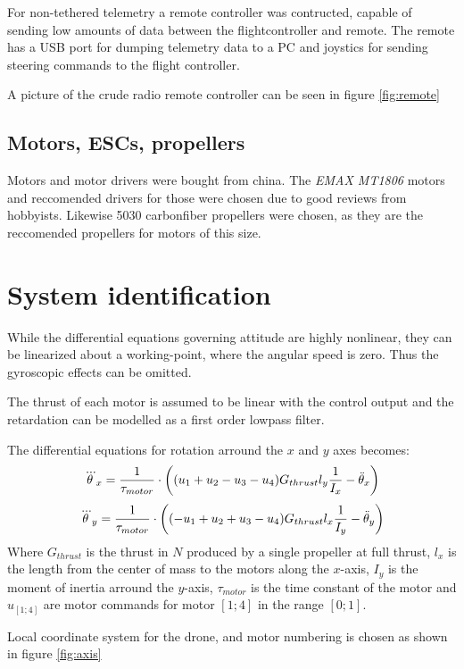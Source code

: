 For non-tethered telemetry a remote controller was contructed, capable of
sending low amounts of data between the flightcontroller and remote. The remote
has a USB port for dumping telemetry data to a PC and joystics for sending
steering commands to the flight controller.

A picture of the crude radio remote controller can be seen in figure
\ref{fig:remote}

\subsection{ Motors, ESCs, propellers }
Motors and motor drivers were bought from china. The \emph{EMAX MT1806} motors
and reccomended drivers for those were chosen due to good reviews from
hobbyists. Likewise 5030 carbonfiber propellers were chosen, as they are the
reccomended propellers for motors of this size.

\section{ System identification } %
While the differential equations governing attitude are highly nonlinear,
they can be linearized about a working-point, where the angular speed is zero.
Thus the gyroscopic effects can be omitted.

The thrust of each motor is assumed to be linear with the control output and the
retardation can be modelled as a first order lowpass filter.

The differential equations for rotation arround the $x$ and $y$ axes
becomes:
\begin{equation}
 \dddot\theta_x = \frac{1}{\tau_{motor}} \cdot \left(
 (u_1 + u_2 - u_3 - u_4) G_{thrust} l_{y} \frac{ 1 }{ I_{x} }  - \ddot\theta_x
 \right) 
\end{equation}
\begin{equation}
 \dddot\theta_y = \frac{1}{\tau_{motor}} \cdot \left(
 (-u_1 + u_2 + u_3 - u_4) G_{thrust} l_{x} \frac{ 1 }{ I_{y} }  - \ddot\theta_y
 \right) 
\end{equation}
Where $G_{thrust}$ is the thrust in $N$ produced by a single propeller at full
thrust, $l_{x}$ is the length from the center of mass to the motors along the
$x$-axis, $I_{y}$ is the moment of inertia arround the $y$-axis,
$\tau_{motor}$ is the time constant of the motor and $u_{[1;4]}$ are motor
commands for motor $[1;4]$ in the range $[0;1]$.

Local coordinate system for the drone, and motor numbering is chosen as shown in
figure \ref{fig:axis}

